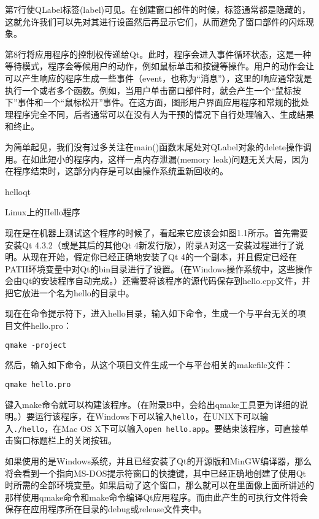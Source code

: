 \documentclass[11pt,oneside]{book}
\begin{document}
\begin{common-format}
第7行使QLabel标签(label)可见。在创建窗口部件的时候，标签通常都是隐藏的，这就允许我们可以先对其进行设置然后再显示它们，从而避免了窗口部件的闪烁现象。

第8行将应用程序的控制权传递给Qt。此时，程序会进入事件循环状态，这是一种等待模式，程序会等候用户的动作，例如鼠标单击和按键等操作。用户的动作会让可以产生响应的程序生成一些事件（event，也称为“消息”），这里的响应通常就是执行一个或者多个函数。例如，当用户单击窗口部件时，就会产生一个“鼠标按下”事件和一个“鼠标松开”事件。在这方面，图形用户界面应用程序和常规的批处理程序完全不同，后者通常可以在没有人为干预的情况下自行处理输入、生成结果和终止。

为简单起见，我们没有过多关注在main()函数末尾处对QLabel对象的delete操作调用。在如此短小的程序内，这样一点内存泄漏(memory  leak)问题无关大局，因为在程序结束时，这部分内存是可以由操作系统重新回收的。
\begin{fig}{helloqt}
\caption{Linux上的Hello程序}
\label{fig:Linux上的Hello程序}
\end{fig}

现在是在机器上测试这个程序的时候了，看起来它应该会如图1.1所示。首先需要安装Qt 4.3.2（或是其后的其他Qt 4新发行版），附录A对这一安装过程进行了说明。从现在开始，假定你已经正确地安装了Qt 4的一个副本，并且假定已经在PATH环境变量中对Qt的bin目录进行了设置。（在Windows操作系统中，这些操作会由Qt的安装程序自动完成。）还需要将该程序的源代码保存到hello.cpp文件，并把它放进一个名为hello的目录中。

现在在命令提示符下，进入hello目录，输入如下命令，生成一个与平台无关的项目文件hello.pro：
\begin{Verbatim}
qmake -project
\end{Verbatim}

然后，输入如下命令，从这个项目文件生成一个与平台相关的makefile文件：

\begin{Verbatim}
qmake hello.pro
\end{Verbatim}

键入make命令就可以构建该程序。（在附录B中，会给出qmake工具更为详细的说明。）要运行该程序，在Windows下可以输入\verb+hello+，在UNIX下可以输入\verb+./hello+，在Mac OS X下可以输入\verb+open hello.app+。要结束该程序，可直接单击窗口标题栏上的关闭按钮。

如果使用的是Windows系统，并且已经安装了Qt的开源版和MinGW编译器，那么将会看到一个指向MS-DOS提示符窗口的快捷键，其中已经正确地创建了使用Qt时所需的全部环境变量。如果启动了这个窗口，那么就可以在里面像上面所讲述的那样使用qmake命令和make命令编译Qt应用程序。而由此产生的可执行文件将会保存在应用程序所在目录的debug或release文件夹中。


\end{common-format}
\end{document}
